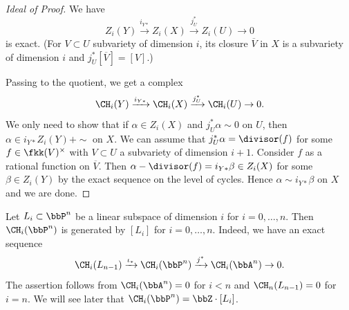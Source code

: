     \begin{proof}[Ideal of Proof]
        We have 
        \[ Z_i(Y) \xrightarrow{i_{Y*}} Z_i(X) \xrightarrow{j_U^*} Z_i(U) \to 0 \]
        is exact.
        (For \(V \subset U\) subvariety of dimension \(i\), its closure \(\overline{V}\) in \(X\) is a subvariety of dimension \(i\) and \(j_U^*[\overline{V}] = [V]\).)

        Passing to the quotient, we get a complex
        \[ \CH_i(Y) \xrightarrow{i_{Y*}} \CH_i(X) \xrightarrow{j_U^*} \CH_i(U) \to 0. \]
        We only need to show that if \(\alpha \in Z_i(X)\) and \(j_U^*\alpha \sim 0\) on \(U\), then \(\alpha \in i_{Y*}Z_i(Y) + \sim\) on \(X\).
        We can assume that \(j_U^*\alpha = \divisor(f)\) for some \(f \in \fkk(V)^\times\) with \(V \subset U\) a subvariety of dimension \(i+1\).
        Consider \(f\) as a rational function on \(\overline{V}\).
        Then \(\alpha - \divisor(f) = i_{Y*}\beta \in Z_i(X)\) for some \(\beta \in Z_i(Y)\) by the exact sequence on the level of cycles.
        Hence \(\alpha \sim i_{Y*}\beta\) on \(X\) and we are done.
    \end{proof}

    \begin{example}
        Let \(L_i \subset \bbP^n\) be a linear subspace of dimension \(i\) for \(i = 0, \ldots, n\).
        Then $\CH_i(\bbP^n)$ is generated by \([L_i]\) for \(i = 0, \ldots, n\).
        Indeed, we have an exact sequence
        \[ \CH_i(L_{n-1}) \xrightarrow{\iota_*} \CH_i(\bbP^n) \xrightarrow{j^*} \CH_i(\bbA^n) \to 0. \]
        The assertion follows from \(\CH_i(\bbA^n) = 0\) for \(i < n\) and \(\CH_n(L_{n-1}) = 0\) for \(i=n\).
        We will see later that \(\CH_i(\bbP^n) = \bbZ\cdot [L_i]\).
    \end{example}
